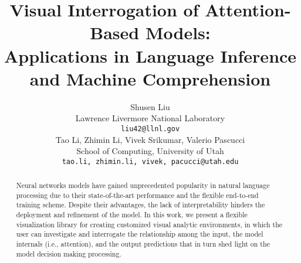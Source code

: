 \documentclass[11pt,a4paper]{article}
\title{Visual Interrogation of Attention-Based Models: \\ Applications in Language Inference and Machine Comprehension}
\author{Shusen Liu \\
  Lawrence Livermore National Laboratory\\
  {\tt liu42@llnl.gov} \\\And
  Tao Li,  Zhimin Li,  Vivek Srikumar, Valerio Pascucci \\
  School of Computing, University of Utah\\
    {\tt {tao.li, zhimin.li, vivek, pacucci}@utah.edu}
}
\begin{document}
\maketitle


\begin{abstract}
Neural networks models have gained unprecedented popularity in natural language processing due to their state-of-the-art performance and the flexible end-to-end training scheme. Despite their advantages, the lack of interpretability hinders the deployment and refinement of the model.
%
In this work, we present a flexible visualization library for creating customized visual analytic environments, in which the user can investigate and interrogate the relationship among the input, the model internals (i.e., attention), and the output predictions that in turn shed light on the model decision making processing.
 
\end{abstract}









\end{document}
